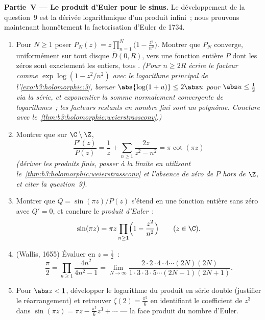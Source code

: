 \begin{problem}
\medskip
\noindent\textbf{Partie~V --- Le produit d'Euler pour le
sinus.} Le développement de la question~9 est la dérivée
logarithmique d'un produit infini~; nous prouvons maintenant
honnêtement la factorisation d'Euler de 1734.
\begin{enumerate}[resume]
  \item Pour $N \geq 1$ poser $P_N(z) =
        z\prod_{n=1}^{N}\bigl(1 - \frac{z^2}{n^2}\bigr)$.
        Montrer que $P_N$ converge, uniformément sur tout
        disque $\bar D(0, R)$, vers une fonction entière $P$
        dont les zéros sont exactement les entiers, tous
        . \emph{(Pour $n \geq 2R$ écrire le facteur
        comme $\exp\log(1 - z^2/n^2)$ avec le logarithme
        principal de l'\cref{exo:b3:holomorphic:3}, borner
        $\abs{\log(1+u)} \leq 2\abs u$ pour $\abs u \leq
        \frac12$ via la série, et exponentier la somme
        normalement convergente de logarithmes~; les
        facteurs restants en nombre fini sont un polynôme.
        Conclure avec le~\cref{thm:b3:holomorphic:weierstrassconv}.)}
  \item Montrer que sur $\C\setminus\Z$,
        \[
        \frac{P'(z)}{P(z)} = \frac1z +
        \sum_{n\geq1}\frac{2z}{z^2 - n^2} = \pi\cot(\pi z)
        \]
        \emph{(dériver les produits finis, passer à la
        limite en utilisant
        le~\cref{thm:b3:holomorphic:weierstrassconv} et
        l'absence de zéro de $P$ hors de $\Z$, et citer la
        question~9)}.
  \item Montrer que $Q = \sin(\pi z)/P(z)$ s'étend en une
        fonction entière sans zéro avec $Q' = 0$, et
        conclure le \emph{produit d'Euler}~:
        \[
        \sin(\pi z) = \pi z\prod_{n\geq1}
        \Bigl(1 - \frac{z^2}{n^2}\Bigr)
        \qquad (z \in \C) .
        \]
  \item (Wallis, 1655) Évaluer en $z = \frac12$~:
        \[
        \frac\pi2 = \prod_{n\geq1}\frac{4n^2}{4n^2 - 1}
        = \lim_{N\to\infty}
        \frac{2\cdot2\cdot4\cdot4\cdots(2N)(2N)}
        {1\cdot3\cdot3\cdot5\cdots(2N-1)(2N+1)} .
        \]
  \item Pour $\abs z < 1$, développer le logarithme du
        produit en série double (justifier le
        réarrangement) et retrouver $\zeta(2) =
        \frac{\pi^2}6$ en identifiant le coefficient de
        $z^3$ dans $\sin(\pi z) = \pi z - \frac{\pi^3}6z^3 +
        \cdots$ --- la face produit du nombre d'Euler.
\end{enumerate}


\end{problem}
